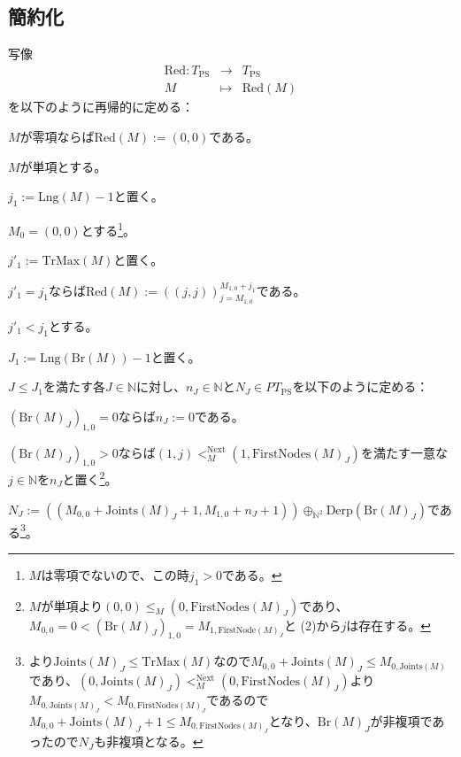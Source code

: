\documentclass[dvipdfmx,uplatex]{jsarticle}
\theoremstyle{customnonumberbreakfortheorem}
\theoremstyle{customnonumberbreakforproof}
\begin{document}
\subsection{簡約化}

写像
\begin{eqnarray*}
\textrm{Red} \colon T_{\textrm{PS}} & \to & T_{\textrm{PS}} \\
M & \mapsto & \textrm{Red}(M)
\end{eqnarray*}
を以下のように再帰的に定める：
\begin{nenumerate}
	\item \(M\)が零項ならば\(\textrm{Red}(M) := (0,0)\)である。
	\item \(M\)が単項とする。
	\begin{nenumerate}
		\item \(j_1 := \textrm{Lng}(M) - 1\)と置く。
		\item \(M_0 = (0,0)\)とする\footnote{\(M\)は零項でないので、この時\(j_1 > 0\)である。}。
		\begin{nenumerate}
			\item \(j'_1 := \textrm{TrMax}(M)\)と置く。
			\item \(j'_1 = j_1\)ならば\(\textrm{Red}(M) := ((j,j))_{j=M_{1,0}}^{M_{1,0}+j_1}\)である。
			\item \(j'_1 < j_1\)とする。
			\item \(J_1 := \textrm{Lng}(\textrm{Br}(M)) - 1\)と置く。
			\item \(J \leq J_1\)を満たす各\(J \in \mathbb{N}\)に対し、\(n_J \in \mathbb{N}\)と\(N_J \in PT_{\textrm{PS}}\)を以下のように定める：
			\begin{nenumerate}
				\item \((\textrm{Br}(M)_J)_{1,0} = 0\)ならば\(n_J := 0\)である。
				\item \((\textrm{Br}(M)_J)_{1,0} > 0\)ならば\((1,j) <_M^{\textrm{Next}} (1,\textrm{FirstNodes}(M)_J)\)を満たす一意な\(j \in \mathbb{N}\)を\(n_J\)と置く\footnote{\(M\)が単項より\((0,0) \leq_M (0,\textrm{FirstNodes}(M)_J)\)であり、\(M_{0,0} = 0 < (\textrm{Br}(M)_J)_{1,0} = M_{1,\textrm{FirstNode}(M)_J}\)と (2)から\(j\)は存在する。}。
				\item \(N_J := ((M_{0,0} + \textrm{Joints}(M)_J + 1,M_{1,0} + n_J + 1)) \oplus_{\mathbb{N}^2} \textrm{Derp}(\textrm{Br}(M)_J)\)である\footnote{より\(\textrm{Joints}(M)_J \leq \textrm{TrMax}(M)\)なので\(M_{0,0} + \textrm{Joints}(M)_J \leq M_{0,\textrm{Joints}(M)}\)であり、\((0,\textrm{Joints}(M)_J) <_M^{\textrm{Next}} (0,\textrm{FirstNodes}(M)_J)\)より\(M_{0,\textrm{Joints}(M)_J} < M_{0,\textrm{FirstNodes}(M)_J}\)であるので\(M_{0,0} + \textrm{Joints}(M)_J + 1 \leq M_{0,\textrm{FirstNodes}(M)_J}\)となり、\(\textrm{Br}(M)_J\)が非複項であったので\(N_J\)も非複項となる。}。

\end{nenumerate}
\end{nenumerate}
\end{nenumerate}
\end{nenumerate}
\end{document}
